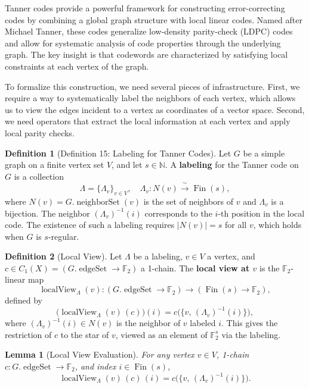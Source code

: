 \documentclass[11pt]{article}
\theoremstyle{plain}
\newtheorem*{lemma}{Lemma}
\theoremstyle{definition}
\newtheorem*{definition}{Definition}
\theoremstyle{remark}
\begin{document}
Tanner codes provide a powerful framework for constructing error-correcting codes by combining a global graph structure with local linear codes. Named after Michael Tanner, these codes generalize low-density parity-check (LDPC) codes and allow for systematic analysis of code properties through the underlying graph. The key insight is that codewords are characterized by satisfying local constraints at each vertex of the graph.

To formalize this construction, we need several pieces of infrastructure. First, we require a way to systematically label the neighbors of each vertex, which allows us to view the edges incident to a vertex as coordinates of a vector space. Second, we need operators that extract the local information at each vertex and apply local parity checks.

\begin{definition}[Definition 15: Labeling for Tanner Codes]
Let $G$ be a simple graph on a finite vertex set $V$, and let $s \in \mathbb{N}$. A \textbf{labeling} for the Tanner code on $G$ is a collection
\[
\Lambda = \{\Lambda_v\}_{v \in V}, \quad \Lambda_v : N(v) \xrightarrow{\;\sim\;} \operatorname{Fin}(s),
\]
where $N(v) = G.\operatorname{neighborSet}(v)$ is the set of neighbors of $v$ and $\Lambda_v$ is a bijection. The neighbor $(\Lambda_v)^{-1}(i)$ corresponds to the $i$-th position in the local code. The existence of such a labeling requires $|N(v)| = s$ for all $v$, which holds when $G$ is $s$-regular.
\end{definition}

\begin{definition}[Local View]
Let $\Lambda$ be a labeling, $v \in V$ a vertex, and $c \in C_1(X) = (G.\operatorname{edgeSet} \to \mathbb{F}_2)$ a 1-chain. The \textbf{local view at $v$} is the $\mathbb{F}_2$-linear map
\[
\operatorname{localView}_\Lambda(v) : (G.\operatorname{edgeSet} \to \mathbb{F}_2) \to (\operatorname{Fin}(s) \to \mathbb{F}_2),
\]
defined by
\[
\bigl(\operatorname{localView}_\Lambda(v)\,(c)\bigr)(i) = c\bigl(\{v,\, (\Lambda_v)^{-1}(i)\}\bigr),
\]
where $(\Lambda_v)^{-1}(i) \in N(v)$ is the neighbor of $v$ labeled $i$. This gives the restriction of $c$ to the star of $v$, viewed as an element of $\mathbb{F}_2^s$ via the labeling.
\end{definition}

\begin{lemma}[Local View Evaluation]
For any vertex $v \in V$, 1-chain $c : G.\operatorname{edgeSet} \to \mathbb{F}_2$, and index $i \in \operatorname{Fin}(s)$,
\[
\operatorname{localView}_\Lambda(v)\,(c)\,(i) = c\bigl(\{v,\, (\Lambda_v)^{-1}(i)\}\bigr).
\]
\end{lemma}
\end{document}
